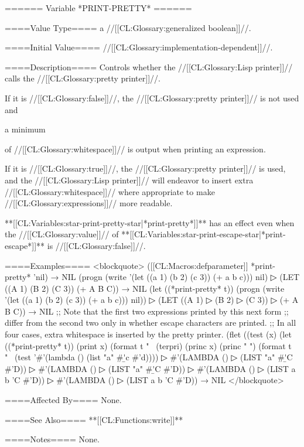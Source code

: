 ====== Variable *PRINT-PRETTY* ======

====Value Type====
a //[[CL:Glossary:generalized boolean]]//.

====Initial Value====
//[[CL:Glossary:implementation-dependent]]//.

====Description====
Controls whether the //[[CL:Glossary:Lisp printer]]// calls the //[[CL:Glossary:pretty printer]]//.

If it is //[[CL:Glossary:false]]//, the //[[CL:Glossary:pretty printer]]// is not used and

a minimum

of //[[CL:Glossary:whitespace]]// is output when printing an expression.

If it is //[[CL:Glossary:true]]//, the //[[CL:Glossary:pretty printer]]// is used, and the //[[CL:Glossary:Lisp printer]]// will endeavor to insert extra //[[CL:Glossary:whitespace]]// where appropriate to make //[[CL:Glossary:expressions]]// more readable.

**[[CL:Variables:star-print-pretty-star|*print-pretty*]]** has an effect even when the //[[CL:Glossary:value]]// of **[[CL:Variables:star-print-escape-star|*print-escape*]]** is //[[CL:Glossary:false]]//.

====Examples====
<blockquote> ([[CL:Macros:defparameter]] *print-pretty* 'nil) → NIL (progn (write '(let ((a 1) (b 2) (c 3)) (+ a b c))) nil)
▷ (LET ((A 1) (B 2) (C 3)) (+ A B C)) → NIL (let ((*print-pretty* t)) (progn (write '(let ((a 1) (b 2) (c 3)) (+ a b c))) nil))
▷ (LET ((A 1)
▷ (B 2)
▷ (C 3))
▷ (+ A B C)) → NIL ;; Note that the first two expressions printed by this next form ;; differ from the second two only in whether escape characters are printed. ;; In all four cases, extra whitespace is inserted by the pretty printer. (flet ((test (x) (let ((*print-pretty* t)) (print x) (format t "~ (terpri) (princ x) (princ " ") (format t "~ (test '#'(lambda () (list "a" #\b 'c #'d))))
▷ #'(LAMBDA ()
▷ (LIST "a" #\b 'C #'D))
▷ #'(LAMBDA ()
▷ (LIST "a" #\b 'C #'D))
▷ #'(LAMBDA ()
▷ (LIST a b 'C #'D))
▷ #'(LAMBDA ()
▷ (LIST a b 'C #'D)) → NIL </blockquote>

====Affected By====
None.

====See Also====
**[[CL:Functions:write]]**

====Notes====
None.

 
